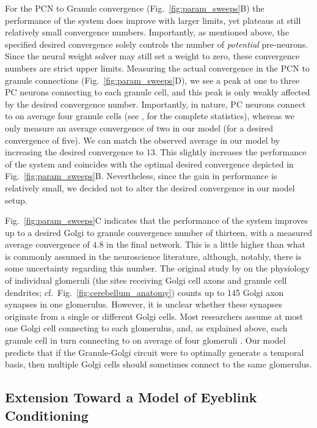 For the PCN to Granule convergence (Fig.~\ref{fig:param_sweeps}B) the performance of the system does improve with larger limits, yet plateaus at still relatively small convergence numbers.
Importantly, as mentioned above, the specified desired convergence solely controls the number of \emph{potential} pre-neurons.
Since the neural weight solver may still set a weight to zero, these convergence numbers are strict upper limits.
Measuring the actual convergence in the PCN to granule connections (Fig.~\ref{fig:param_sweeps}D), we see a peak at one to three PC neurons connecting to each granule cell, and this peak is only weakly affected by the desired convergence number.
Importantly, in nature, PC neurons connect to on average four granule cells (see \cite{palkovits1972quantitative}, for the complete statistics), whereas we only measure an average convergence of two in our model (for a desired convergence of five).
We can match the observed average in our model by increasing the desired convergence to 13. This slightly increases the performance of the system and coincides with the optimal desired convergence depicted in Fig.~\ref{fig:param_sweeps}B.
Nevertheless, since the gain in performance is relatively small, we decided not to alter the desired convergence in our model setup.

Fig.~\ref{fig:param_sweeps}C indicates that the performance of the system improves up to a desired Golgi to granule convergence number of thirteen, with a measured average convergence of $4.8$ in the final network.
This is a little higher than what is commonly assumed in the neuroscience literature, although, notably, there is some uncertainty regarding this number.
The original study by \citet{jakab1988quantitative} on the physiology of individual glomeruli (the sites receiving Golgi cell axons and granule cell dendrites; cf.~Fig.~\ref{fig:cerebellum_anatomy}) counts up to 145 Golgi axon synapses in one glomerulus.
However, it is unclear whether these synapses originate from a single or different Golgi cells.
Most researchers assume at most one Golgi cell connecting to each glomerulus, and, as explained above, each granule cell in turn connecting to on average of four glomeruli \cite{palkovits1972quantitative}.
Our model predicts that if the Granule-Golgi circuit were to optimally generate a temporal basis, then multiple Golgi cells should sometimes connect to the same glomerulus.

\subsection{Extension Toward a Model of Eyeblink Conditioning}

